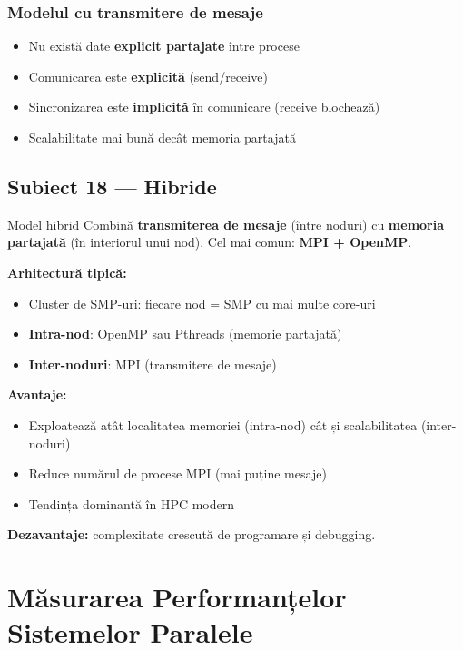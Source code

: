 \documentclass[a4paper,11pt]{article}
\newcommand{\subiect}[2]{\subsection{Subiect \textcolor{numcol}{#1} — #2}}
\begin{document}
\subsubsection{Modelul cu transmitere de mesaje}
\begin{itemize}[noitemsep]
  \item Nu există date \textbf{explicit partajate} între procese
  \item Comunicarea este \textbf{explicită} (send/receive)
  \item Sincronizarea este \textbf{implicită} în comunicare (receive blochează)
  \item Scalabilitate mai bună decât memoria partajată
\end{itemize}

\subiect{18}{Hibride}

\begin{defbox}{Model hibrid}
Combină \textbf{transmiterea de mesaje} (între noduri) cu \textbf{memoria partajată} (în interiorul unui nod). Cel mai comun: \textbf{MPI + OpenMP}.
\end{defbox}

\textbf{Arhitectură tipică:}
\begin{itemize}[noitemsep]
  \item Cluster de SMP-uri: fiecare nod = SMP cu mai multe core-uri
  \item \textbf{Intra-nod}: OpenMP sau Pthreads (memorie partajată)
  \item \textbf{Inter-noduri}: MPI (transmitere de mesaje)
\end{itemize}

\textbf{Avantaje:}
\begin{itemize}[noitemsep]
  \item Exploatează atât localitatea memoriei (intra-nod) cât și scalabilitatea (inter-noduri)
  \item Reduce numărul de procese MPI (mai puține mesaje)
  \item Tendința dominantă în HPC modern
\end{itemize}

\textbf{Dezavantaje:} complexitate crescută de programare și debugging.

\section{Măsurarea Performanțelor Sistemelor Paralele}
\end{document}
